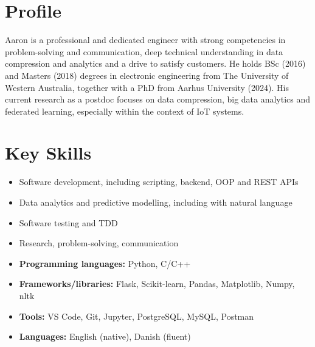 \documentclass[a4paper,11pt]{article}
\begin{document}






\section{Profile}\vspace{-0.3em}

\noindent
Aaron is a professional and dedicated engineer with strong competencies in problem-solving and communication, deep technical understanding in data compression and analytics and a drive to satisfy customers.
He holds BSc (2016) and Masters (2018) degrees in electronic engineering from The University of Western Australia, together with a PhD from Aarhus University (2024).
His current research as a postdoc focuses on data compression, big data analytics and federated learning, especially within the context of IoT systems.




\section{Key Skills}\vspace{-1.3em}

\begin{multicols}{2}
    \begin{itemize}[topsep=0pt,itemsep=-0.3em]
        \item Software development, including scripting, backend, OOP and REST APIs
        \item Data analytics and predictive modelling, including with natural language
        \item Software testing and TDD
        \item Research, problem-solving, communication

        \item \textbf{Programming languages:} Python, C/C++
        \item \textbf{Frameworks/libraries:} Flask, Scikit-learn, Pandas, Matplotlib, Numpy, nltk
        \item \textbf{Tools:} VS Code, Git, Jupyter, PostgreSQL, MySQL, Postman
        \item \textbf{Languages:} English (native), Danish (fluent)
    \end{itemize}
\end{multicols}
\vspace{-0.7em}
\end{document}
